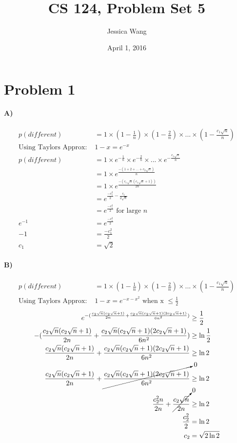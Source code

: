 \documentclass[11pt]{article}
\title{CS 124, Problem Set 5}
\author{Jessica Wang}
\date{April 1, 2016}
\begin{document}
\maketitle
\section*{Problem 1}
\paragraph{A)}
\begin{align*}
p(different) &= 1\times (1-\frac{1}{n}) \times (1-\frac{2}{n}) \times ... \times (1-\frac{c_1\sqrt{n}}{n})\\
\text{Using Taylors Approx: }&1-x = e^{-x}\\
p(different) &= 1\times e^{-\frac{1}{n}} \times e^{-\frac{2}{n}} \times ... \times e^{-\frac{c_1\sqrt{n}}{n}}\\
&= 1 \times e^{\frac{-(1+2+...+c_2\sqrt{n})}{n}}\\
&=1 \times e^{\frac{-(c_1\sqrt{n}(c_1\sqrt{n}+1))}{2n}}\\
&= e^{\frac{-c_1^2}{2} - \frac{c_1}{2\sqrt{n}}}\\
&= e^{\frac{-c_1^2}{2}} \text{  for large }n\\
e^{-1} &= e^{\frac{-c_1^2}{2}}\\
-1 &= \frac{-c_1^2}{2}\\
c_1&=\sqrt{2}
\end{align*}
\paragraph{B)}
\begin{align*}
p(different) &= 1\times (1-\frac{1}{n}) \times (1-\frac{2}{n}) \times ... \times (1-\frac{c_1\sqrt{n}}{n})\\
\text{Using Taylors Approx: }&1-x = e^{-x-x^2}\text{  when x }\leq \frac{1}{2}
\end{align*}
\begin{align*}
e^{-(\frac{c_2\sqrt{n}(c_2\sqrt{n}+1)}{2n} + \frac{c_2\sqrt{n}(c_2\sqrt{n}+1)(2c_2\sqrt{n}+1)}{6n^2})} &\geq \frac{1}{2}\\
-(\frac{c_2\sqrt{n}(c_2\sqrt{n}+1)}{2n} + \frac{c_2\sqrt{n}(c_2\sqrt{n}+1)(2c_2\sqrt{n}+1)}{6n^2}) &\geq \ln{\frac{1}{2}}\\
\frac{c_2\sqrt{n}(c_2\sqrt{n}+1)}{2n} + \frac{c_2\sqrt{n}(c_2\sqrt{n}+1)(2c_2\sqrt{n}+1)}{6n^2} &\geq \ln{2}\\
\frac{c_2\sqrt{n}(c_2\sqrt{n}+1)}{2n} + \cancelto{0}{\frac{c_2\sqrt{n}(c_2\sqrt{n}+1)(2c_2\sqrt{n}+1)}{6n^2}} &\geq \ln{2}\\
\frac{c_2^2n}{2n} + \cancelto{0}{\frac{c_2\sqrt{n}}{2n}} &\geq \ln{2}\\
\frac{c_2^2}{2} &= \ln{2}\\
c_2&=\sqrt{2 \ln{2}}
\end{align*}
\end{document}
